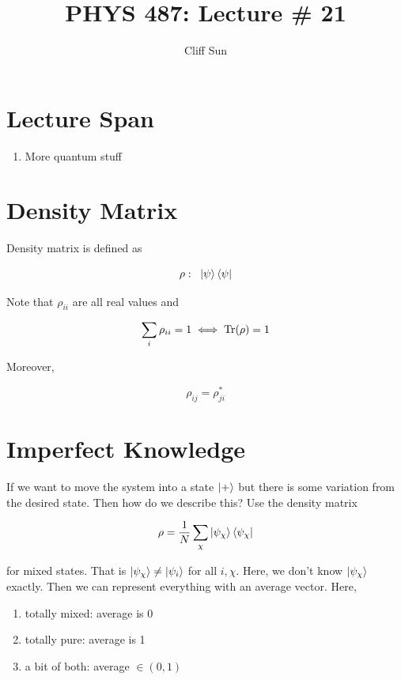 \documentclass{article}
\title{PHYS 487: Lecture \# 21}
\author{Cliff Sun}
\newtheorem{one minute paper}[theorem]{One Minute Paper}
\begin{document}
\maketitle

\section*{Lecture Span}
\begin{enumerate}
    \item More quantum stuff
\end{enumerate}

\section*{Density Matrix}

Density matrix is defined as 

\begin{equation}
    \rho: \;\; \ket{\psi}\bra{\psi}
\end{equation}

Note that $\rho_{ii}$ are all real values and 

\begin{equation}
    \sum_i \rho_{ii} =1 \iff \Tr(\rho) = 1
\end{equation}

Moreover, 

\begin{equation}
    \rho_{ij} = \rho_{ji}^{*}
\end{equation}

\section*{Imperfect Knowledge}

If we want to move the system into a state $\ket{+}$ but there is some variation from the desired state. Then how do we describe this? Use the density matrix 

\begin{equation}
    \rho = \frac{1}{N}\sum_{\chi}\ket{\psi_{\chi}}\bra{\psi_{\chi}}
\end{equation}

for mixed states. That is $\ket{\psi_{\chi}} \neq \ket{\psi_{i}}$ for all $i, \chi$. Here, we don't know $\ket{\psi_{\chi}}$ exactly. Then we can represent everything with an average vector. Here, 

\begin{enumerate}
    \item totally mixed: average is $0$
    \item totally pure: average is 1
    \item a bit of both: average $\in (0,1)$
\end{enumerate}
\end{document}
